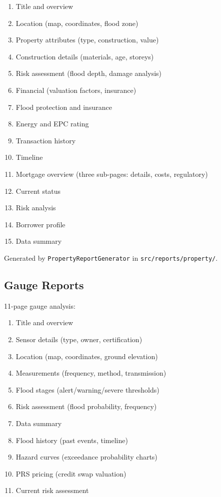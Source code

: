 \documentclass[11pt,a4paper]{article}
\begin{document}
\begin{enumerate}[nosep]
    \item Title and overview
    \item Location (map, coordinates, flood zone)
    \item Property attributes (type, construction, value)
    \item Construction details (materials, age, storeys)
    \item Risk assessment (flood depth, damage analysis)
    \item Financial (valuation factors, insurance)
    \item Flood protection and insurance
    \item Energy and EPC rating
    \item Transaction history
    \item Timeline
    \item Mortgage overview (three sub-pages: details, costs, regulatory)
    \item Current status
    \item Risk analysis
    \item Borrower profile
    \item Data summary
\end{enumerate}

Generated by \texttt{PropertyReportGenerator} in \texttt{src/reports/property/}.

\subsection{Gauge Reports}

11-page gauge analysis:

\begin{enumerate}[nosep]
    \item Title and overview
    \item Sensor details (type, owner, certification)
    \item Location (map, coordinates, ground elevation)
    \item Measurements (frequency, method, transmission)
    \item Flood stages (alert/warning/severe thresholds)
    \item Risk assessment (flood probability, frequency)
    \item Data summary
    \item Flood history (past events, timeline)
    \item Hazard curves (exceedance probability charts)
    \item PRS pricing (credit swap valuation)
    \item Current risk assessment
\end{enumerate}
\end{document}
